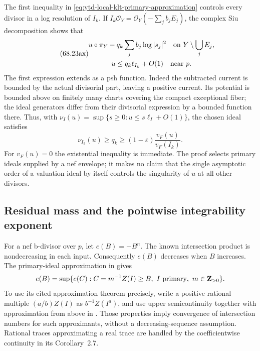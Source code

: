 The first inequality in \eqref{eq:ytd-local-klt-primary-approximation}
controls every divisor in a log resolution of $I_k$. If
$I_k\mathcal O_Y=\mathcal O_Y(-\sum_jb_jE_j)$, the complex Siu
decomposition shows that
\[
\tag{68.23ax}\label{eq:ytd-local-klt-analytic-comparison}
 \begin{gathered}
 u\circ\pi_Y-q_k\sum_jb_j\log|s_j|^2
 \quad\hbox{on }Y\setminus\bigcup_j E_j,\\
 u\leq q_k\ell_{I_k}+O(1)\quad\hbox{near }p.
 \end{gathered}
\]
The first expression extends as a psh function. Indeed the
subtracted current is bounded by the actual divisorial
part, leaving a positive current. Its potential is bounded above
on finitely many charts covering the compact exceptional fiber;
the ideal generators differ from their divisorial expression by a
bounded function there. Thus, with
$\nu_I(u)=\sup\{s\geq0:u\leq s\ell_I+O(1)\}$, the chosen ideal
satisfies
\[
\tag{68.23ay}\label{eq:ytd-local-klt-ideal-selection}
 \nu_{I_k}(u)\geq q_k
 \geq(1-\varepsilon)\frac{v_F(u)}{v_F(I_k)}.
\]
For $v_F(u)=0$ the existential inequality is immediate. The proof
selects primary ideals supplied by a nef envelope; it makes no
claim that the single asymptotic order of a valuation ideal by
itself controls the singularity of $u$ at all other divisors.

\subsection{Residual mass and the pointwise integrability exponent}
\label{sec:ytd-local-klt-residual-mass}

For a nef b-divisor over $p$, let $e(B)=-B^n$. The known
intersection product is nondecreasing in each input. Consequently
$e(B)$ decreases when $B$ increases. The primary-ideal approximation
in \cite[Lemma~A.8]{GuedjTrusiani25LocalPublished} gives
\[
 e(B)=\sup\{e(C): C=m^{-1}Z(I)\geq B,
                         \ I\ {\rm primary},\ m\in\mathbf Z_{>0}\}.
\]
To use its cited approximation theorem precisely, write a positive
rational multiple $(a/b)Z(I)$ as $b^{-1}Z(I^a)$, and use
upper semicontinuity together with approximation from above in
\cite[Theorem~4.14 and its proof]{BdFF12PublishedAuthor}.
Those properties imply convergence of intersection numbers for
such approximants, without a decreasing-sequence assumption.
Rational traces approximating a real trace are handled by the
coefficientwise continuity in its Corollary~2.7.

